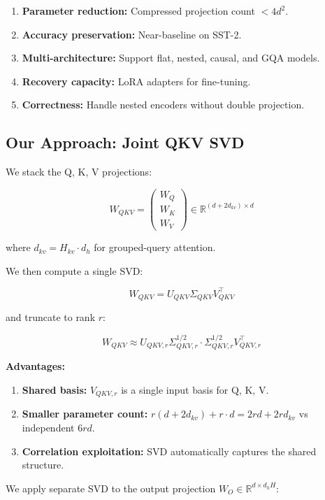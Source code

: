 \begin{enumerate}
\item \textbf{Parameter reduction:} Compressed projection count $< 4 d^2$.
\item \textbf{Accuracy preservation:} Near-baseline on SST-2.
\item \textbf{Multi-architecture:} Support flat, nested, causal, and GQA models.
\item \textbf{Recovery capacity:} LoRA adapters for fine-tuning.
\item \textbf{Correctness:} Handle nested encoders without double projection.

\end{enumerate}
\subsection{Our Approach: Joint QKV SVD}

We stack the Q, K, V projections:

\begin{equation}
W_{QKV} = \begin{pmatrix} W_Q \\ W_K \\ W_V \end{pmatrix} \in \mathbb{R}^{(d + 2 d_{kv}) \times d}
\end{equation}

where $d_{kv} = H_{kv} \cdot d_h$ for grouped-query attention.

We then compute a single SVD:

\begin{equation}
W_{QKV} = U_{QKV} \Sigma_{QKV} V_{QKV}^\top
\end{equation}

and truncate to rank $r$:

\begin{equation}
W_{QKV} \approx U_{QKV, r} \Sigma_{QKV, r}^{1/2} \cdot \Sigma_{QKV, r}^{1/2} V_{QKV, r}^\top
\end{equation}

\textbf{Advantages:}

\begin{enumerate}
\item \textbf{Shared basis:} $V_{QKV, r}$ is a single input basis for Q, K, V.
\item \textbf{Smaller parameter count:} $r(d + 2d_{kv}) + r \cdot d = 2rd + 2r d_{kv}$ vs
  independent $6rd$.
\item \textbf{Correlation exploitation:} SVD automatically captures the shared
  structure.

\end{enumerate}
We apply separate SVD to the output projection $W_O \in \mathbb{R}^{d \times d_h H}$:

